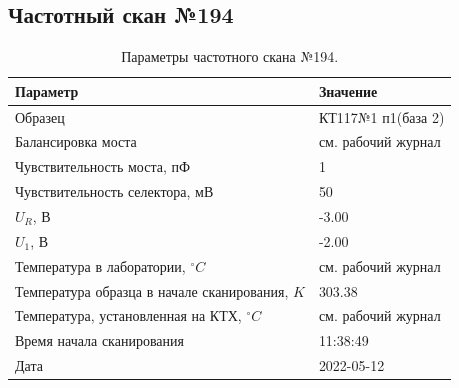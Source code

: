 \subsection{Частотный скан №194}
\begin{table}[!ht]
    \centering
    \caption{Параметры частотного скана №194.}
    \begin{tabular}{|l|l|}
        \hline
        Параметр                                       & Значение                  \\ \hline
        Образец                                        & КТ117№1 п1(база 2)        \\ \hline
        Балансировка моста                             & см. рабочий журнал        \\ \hline
        Чувствительность моста, пФ                     & 1                         \\ \hline
        Чувствительность селектора, мВ                 & 50                        \\ \hline
        $U_R$, В                                       & -3.00                     \\ \hline
        $U_1$, В                                       & -2.00                     \\ \hline
        Температура в лаборатории, $^\circ C$          & см. рабочий журнал        \\ \hline
        Температура образца в начале сканирования, $K$ & 303.38                    \\ \hline
        Температура, установленная на КТХ, $^\circ C$  & см. рабочий журнал        \\ \hline
        Время начала сканирования                      & 11:38:49                  \\ \hline
        Дата                                           & 2022-05-12                \\ \hline
    \end{tabular}
    \label{table:frequency_scan_194}
\end{table}

